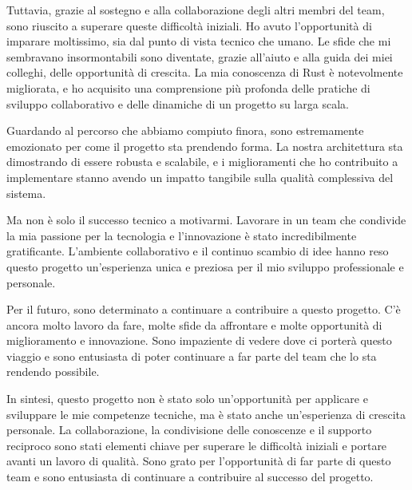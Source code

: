 \documentclass[target=bach,aauheader=,style=]{thud}
\begin{document}
Tuttavia, grazie al sostegno e alla collaborazione degli altri membri del team, sono riuscito a superare queste difficoltà iniziali. Ho avuto l'opportunità di imparare moltissimo, sia dal punto di vista tecnico che umano. Le sfide che mi sembravano insormontabili sono diventate, grazie all'aiuto e alla guida dei miei colleghi, delle opportunità di crescita. La mia conoscenza di Rust è notevolmente migliorata, e ho acquisito una comprensione più profonda delle pratiche di sviluppo collaborativo e delle dinamiche di un progetto su larga scala.

Guardando al percorso che abbiamo compiuto finora, sono estremamente emozionato per come il progetto sta prendendo forma. La nostra architettura sta dimostrando di essere robusta e scalabile, e i miglioramenti che ho contribuito a implementare stanno avendo un impatto tangibile sulla qualità complessiva del sistema.

Ma non è solo il successo tecnico a motivarmi. Lavorare in un team che condivide la mia passione per la tecnologia e l'innovazione è stato incredibilmente gratificante. L'ambiente collaborativo e il continuo scambio di idee hanno reso questo progetto un'esperienza unica e preziosa per il mio sviluppo professionale e personale.

Per il futuro, sono determinato a continuare a contribuire a questo progetto. C'è ancora molto lavoro da fare, molte sfide da affrontare e molte opportunità di miglioramento e innovazione. Sono impaziente di vedere dove ci porterà questo viaggio e sono entusiasta di poter continuare a far parte del team che lo sta rendendo possibile.

In sintesi, questo progetto non è stato solo un'opportunità per applicare e sviluppare le mie competenze tecniche, ma è stato anche un'esperienza di crescita personale. La collaborazione, la condivisione delle conoscenze e il supporto reciproco sono stati elementi chiave per superare le difficoltà iniziali e portare avanti un lavoro di qualità. Sono grato per l'opportunità di far parte di questo team e sono entusiasta di continuare a contribuire al successo del progetto.



\end{document}
